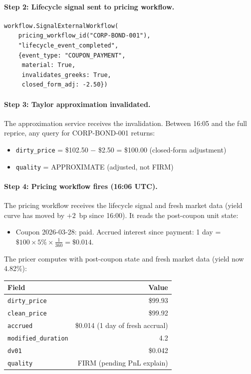 \documentclass[11pt,a4paper]{article}
\begin{document}
\paragraph{Step 2: Lifecycle signal sent to pricing workflow.}
\begin{lstlisting}
workflow.SignalExternalWorkflow(
    pricing_workflow_id("CORP-BOND-001"),
    "lifecycle_event_completed",
    {event_type: "COUPON_PAYMENT",
     material: True,
     invalidates_greeks: True,
     closed_form_adj: -2.50})
\end{lstlisting}

\paragraph{Step 3: Taylor approximation invalidated.}  The approximation service receives the invalidation.  Between 16:05 and the full reprice, any query for CORP-BOND-001 returns:
\begin{itemize}[nosep]
\item \texttt{dirty\_price} = \$102.50 $-$ \$2.50 = \$100.00 (closed-form adjustment)
\item \texttt{quality} = APPROXIMATE (adjusted, not FIRM)
\end{itemize}

\paragraph{Step 4: Pricing workflow fires (16:06 UTC).}  The pricing workflow receives the lifecycle signal and fresh market data (yield curve has moved by $+2$~bp since 16:00).  It reads the post-coupon unit state:
\begin{itemize}[nosep]
\item Coupon 2026-03-28: paid.  Accrued interest since payment: 1 day = $\$100 \times 5\% \times \frac{1}{360} = \$0.014$.
\end{itemize}

\noindent The pricer computes with post-coupon state and fresh market data (yield now 4.82\%):

\begin{center}
\small
\begin{tabular}{l r}
\toprule
\textbf{Field} & \textbf{Value} \\
\midrule
\texttt{dirty\_price} & \$99.93 \\
\texttt{clean\_price} & \$99.92 \\
\texttt{accrued} & \$0.014 (1 day of fresh accrual) \\
\texttt{modified\_duration} & 4.2 \\
\texttt{dv01} & \$0.042 \\
\texttt{quality} & FIRM (pending PnL explain) \\
\bottomrule
\end{tabular}
\end{center}
\end{document}
